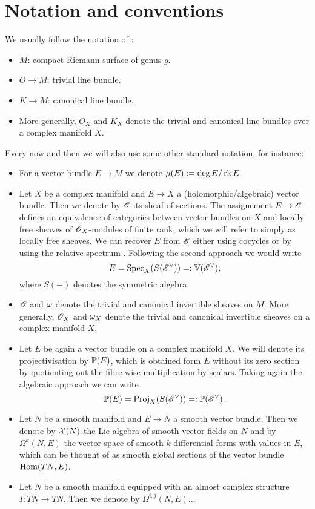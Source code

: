 \section*{Notation and conventions}\label{sec:notation}

We usually follow the notation of \cite{hit87a}:
\begin{itemize}
    \item $M$: compact Riemann surface of genus $g$.
    \item $O\to M$: trivial line bundle.
    \item $K\to M$: canonical line bundle.
    \item More generally, $O_{X}$ and $K_{X}$ denote the trivial and canonical line bundles over a complex manifold $X$.
\end{itemize}
Every now and then we will also use some other standard notation, for instance:
\begin{itemize}
    \item For a vector bundle $E\to M$ we denote $\mu(E):=\deg{E}/\rk{E}$.
    \item Let $X$ be a complex manifold and $E\to X$ a (holomorphic/algebraic) vector bundle.
	Then we denote by $\E$ its sheaf of sections.
	The assignement $E\mapsto \E$ defines an equivalence of categories between vector bundles on $X$ and locally free sheaves of $\O_{X}$-modules of finite rank, which we will refer to simply as locally free sheaves.
	We can recover $E$ from $\E$ either using cocycles \cite[Lemma 4.8]{voi02} or by using the relative spectrum \cite[Exercise II.5.18]{har77}.
	Following the second approach we would write
	\[ E=\Spec_{X}(S(\E\dual))=:\V(\E\dual), \]
	where $S(-)$ denotes the symmetric algebra.
    \item $\O$ and $\w$ denote the trivial and canonical invertible sheaves on $M$.
	More generally, $\O_{X}$ and $\w_{X}$ denote the trivial and canonical invertible sheaves on a complex manifold $X$,
    \item Let $E$ be again a vector bundle on a complex manifold $X$.
	We will denote its projectivisation by $\P(E)$, which is obtained form $E$ without its zero section by quotienting out the fibre-wise multiplication by scalars.
	Taking again the algebraic approach we can write
	\[ \P(E)=\Proj_{X}(S(\E\dual))=:\P(\E\dual). \]
    \item Let $N$ be a smooth manifold and $E\to N$ a smooth vector bundle.
	Then we denote by $\X(N)$ the Lie algebra of smooth vector fields on $N$ and by $\Omega^{k}(N,E)$ the vector space of smooth $k$-differential forms with values in $E$, which can be thought of as smooth global sections of the vector bundle $\Hom(TN,E)$.
    \item Let $N$ be a smooth manifold equipped with an almost complex structure $I\colon TN\to TN$.
	Then we denote by $\Omega^{i,j}(N,E)$...
\end{itemize}



\vfill


